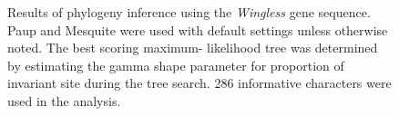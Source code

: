 \documentclass{article}\usepackage[]{graphicx}\usepackage[]{color}
\begin{document}
\begin{figure}[ht]
 \hspace{10pt}   
 \caption[fig:wingless]{%
  Results of phylogeny inference using the \textit{Wingless} gene sequence. 
  Paup and Mesquite were used with default settings unless otherwise noted. 
  The best scoring maximum- likelihood tree  was determined by estimating the gamma shape parameter for proportion of invariant site during the tree search.
  286 informative characters were used in the analysis.}
 \label{fig:wingless}
\end{figure}



\end{document}
